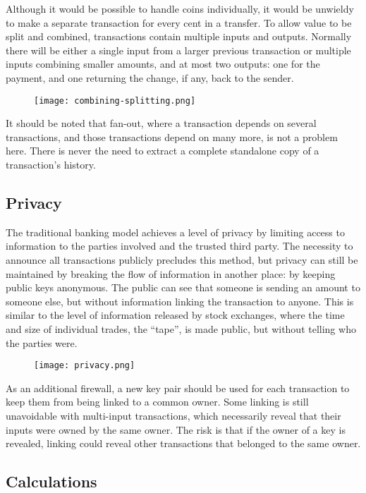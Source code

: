 Although it would be possible to handle coins individually, it would be
unwieldy to make a separate transaction for every cent in a transfer. To
allow value to be split and combined, transactions contain multiple
inputs and outputs. Normally there will be either a single input from a
larger previous transaction or multiple inputs combining smaller
amounts, and at most two outputs: one for the payment, and one returning
the change, if any, back to the sender.

\begin{figure}
\centering
\texttt{[image: combining-splitting.png]}
\caption{}
\end{figure}

It should be noted that fan-out, where a transaction depends on several
transactions, and those transactions depend on many more, is not a
problem here. There is never the need to extract a complete standalone
copy of a transaction's history.

\subsection{Privacy}\label{privacy}

The traditional banking model achieves a level of privacy by limiting
access to information to the parties involved and the trusted third
party. The necessity to announce all transactions publicly precludes
this method, but privacy can still be maintained by breaking the flow of
information in another place: by keeping public keys anonymous. The
public can see that someone is sending an amount to someone else, but
without information linking the transaction to anyone. This is similar
to the level of information released by stock exchanges, where the time
and size of individual trades, the ``tape'', is made public, but without
telling who the parties were.

\begin{figure}
\centering
\texttt{[image: privacy.png]}
\caption{}
\end{figure}

As an additional firewall, a new key pair should be used for each
transaction to keep them from being linked to a common owner. Some
linking is still unavoidable with multi-input transactions, which
necessarily reveal that their inputs were owned by the same owner. The
risk is that if the owner of a key is revealed, linking could reveal
other transactions that belonged to the same owner.

\subsection{Calculations}\label{calculations}

